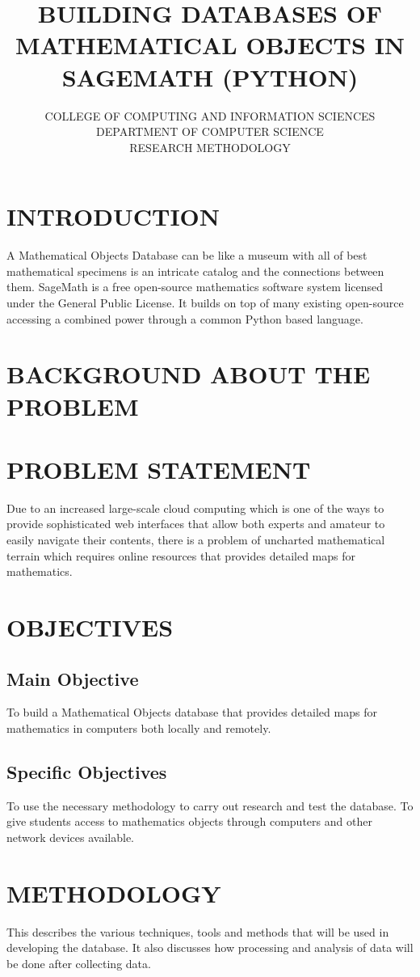 \documentclass[11pt]{report}
\title{\textbf{BUILDING DATABASES OF MATHEMATICAL OBJECTS IN SAGEMATH (PYTHON)}}
\author{COLLEGE OF COMPUTING AND INFORMATION SCIENCES\\DEPARTMENT OF COMPUTER SCIENCE\\RESEARCH METHODOLOGY}
\begin{document}
\maketitle

\section{INTRODUCTION}
A Mathematical Objects Database can be like a museum with all of best mathematical specimens is an intricate catalog and the connections between them. SageMath is a free open-source mathematics software system licensed under the General Public License. It builds on top of many existing open-source accessing a combined power through a common Python based language.

\section{BACKGROUND ABOUT THE PROBLEM}

\section{PROBLEM STATEMENT}
Due to an increased large-scale cloud computing which is one of the ways to
provide sophisticated web interfaces that allow both experts and amateur to
easily navigate their contents, there is a problem of uncharted mathematical
terrain which requires online resources that provides detailed maps for
mathematics.
\section{OBJECTIVES}
\subsection{Main Objective}
To build a Mathematical Objects database that provides detailed maps for
mathematics in computers both locally and remotely.

\subsection{Specific Objectives}
To use the necessary methodology to carry out research and test the database.
To give students access to mathematics objects through computers and other
network devices available.

\section{METHODOLOGY}
This describes the various techniques, tools and methods that will be used in developing the database. It also discusses how processing and analysis of data will be done after collecting data. 
\end{document}
